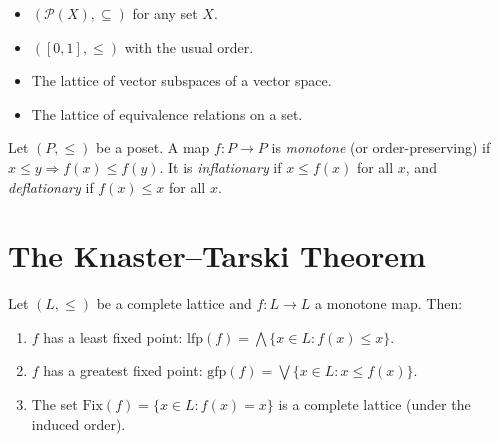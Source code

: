 \begin{example}
\begin{itemize}
  \item $(\mathcal{P}(X), \subseteq)$ for any set $X$.
  \item $([0,1], \leq)$ with the usual order.
  \item The lattice of vector subspaces of a vector space.
  \item The lattice of equivalence relations on a set.
\end{itemize}
\end{example}

\begin{definition}
Let $(P, \leq)$ be a poset. A map $f\colon P \to P$ is \emph{monotone} (or
order-preserving) if $x \leq y \Rightarrow f(x) \leq f(y)$. It is \emph{inflationary} if
$x \leq f(x)$ for all $x$, and \emph{deflationary} if $f(x) \leq x$ for all $x$.
\end{definition}

\section{The Knaster--Tarski Theorem}

\begin{theorem}
\label{thm:knaster-tarski}
Let $(L, \leq)$ be a complete lattice and $f\colon L \to L$ a monotone map. Then:
\begin{enumerate}
  \item $f$ has a least fixed point:
    $\mathrm{lfp}(f) = \bigwedge \{x \in L : f(x) \leq x\}$.
  \item $f$ has a greatest fixed point:
    $\mathrm{gfp}(f) = \bigvee \{x \in L : x \leq f(x)\}$.
  \item The set $\mathrm{Fix}(f) = \{x \in L : f(x) = x\}$ is a complete lattice (under
    the induced order).
\end{enumerate}
\end{theorem}

